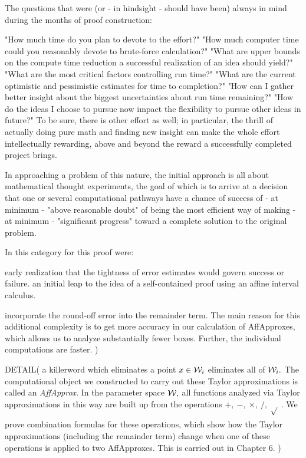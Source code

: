 The questions that were (or - in hindsight - should have been)
always in mind during the months of proof construction:
\begin{itemize}
   "How much time do you plan to devote to the effort?"
   "How much computer time could you reasonably devote to brute-force calculation?"
   "What are upper bounds on the compute time reduction
              a successful realization of an idea should yield?"
   "What are the most critical factors controlling run time?"
   "What are the current optimistic and pessimistic estimates for time to completion?"
   "How can I gather better insight about the biggest uncertainties about run time remaining?"
   "How do the ideas I choose to pursue now impact the flexibility
               to pursue other ideas in future?"
To be sure, there is other effort as well;
in particular, the thrill of actually doing pure math and finding new insight
can make the whole effort intellectually rewarding,
above and beyond the reward a successfully completed project brings.

In approaching a problem of this nature, the initial approach is all about
mathematical thought experiments,
the goal of which is to arrive at a decision
that one or several computational pathways
have a chance of success
of - at minimum - "above reasonable doubt"
of being the most efficient way
of making - at minimum - "significant progress"
toward a complete solution to the original problem.

In this category for this proof were:
\begin{itemize}
   early realization that the tightness of error estimates would govern success or failure.
   an initial leap to the idea of a self-contained proof using an affine interval calculus.

incorporate the round-off error into the remainder term.  
The main reason for this additional complexity is to get
more accuracy in our calculation of AffApproxes, 
which allows us to analyze substantially fewer boxes.
Further, the individual computations are faster.
)

DETAIL(
a killerword which eliminates a point $x\in {\cal W}_i$ eliminates all of ${\cal W}_i.$  
The computational object we constructed to carry out these Taylor approximations is called an {\it AffApprox}.
In the parameter space ${\cal W},$ all functions analyzed via Taylor
approximations in this way are built up from the
operations $ +,\ -,\ \times, \  /,\ \sqrt{}_{\phantom{|}} .$  We prove combination
formulas for these operations, which show how the Taylor approximations
(including the remainder term) change when one of these operations is
applied to two AffApproxes.   This is carried out in Chapter 6. 
)


\end{itemize}
\end{itemize}
